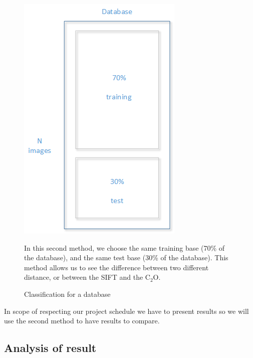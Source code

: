 \documentclass[12pt]{article}
\begin{document}
\begin{itemize}
\begin{figure}[h]
    \begin{minipage}{0.50\linewidth}
        \includegraphics[scale=0.7]{proced3.png}
        \caption{Classification for a database}\label{fig:proced3}
    \end{minipage}\hfill
    \begin{minipage}{0.55\linewidth}
        In this second method, we choose the same training base (70\% of the database), and the same test base (30\% of the database). This method allows us to see the difference between two different distance, or between the SIFT and the C$_2$O.
    \end{minipage}
\end{figure}

\end{itemize}

In scope of respecting our project schedule we have to present results so we will use the second method to have results to compare. 

\subsection{Analysis of result}

\end{document}
